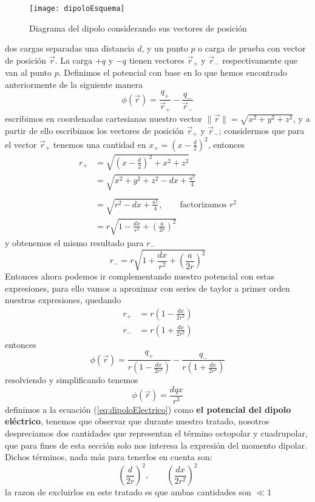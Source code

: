 \documentclass[11pt,a4paper]{article}
\begin{document}
\begin{figure}[h!]
\centering
\texttt{[image: dipoloEsquema]}
\caption{Diagrama del dipolo considerando sus vectores de posición
}
\label{fig:dipoloEsquema}
\end{figure}
dos cargas separadas una distancia $d$, y un punto $p$ o carga de prueba con vector de posición $\vec{r}$. La carga $+q$ y $-q$ tienen vectores $\vec{r}_+$ y $\vec{r}_-$ respectivamente que van al punto $p$. Definimos el potencial con base en lo que hemos encontrado anteriormente de la siguiente manera
$$\phi(\vec{r})=\frac{q_+}{\vec{r}_+}-\frac{q_-}{\vec{r}_-}$$
escribimos en coordenadas cartesianas nuestro vector $\|\vec{r}\|=\sqrt{x^2+y^2+z^2}$, y a partir de ello escribimos los vectores de posición $\vec{r}_+$ y $\vec{r}_-$; considermos que para el vector $\vec{r}_+$ tenemos una cantidad en $x_+=\left(x-\frac{d}{2}\right)^2$, entonces
\begin{align*}
r_+&=\sqrt{\left(x-\frac{d}{2}\right)^2+x^2+z^2} \\
&=\sqrt{x^2+y^2+z^2-dx+\frac{a^2}{4}}\\\\
&=\sqrt{r^2-dx+\frac{a^2}{4}},\qquad\text{factorizamos }r^2\\
&=r\sqrt{1-\frac{dx}{r^2}+\left(\frac{a}{2r}\right)^2}
\end{align*}
y obtenemos el mismo resultado para $r_-$
$$r_-=r\sqrt{1+\frac{dx}{r^2}+\left(\frac{a}{2r}\right)^2}$$
Entonces ahora podemos ir complementando nuestro potencial con estas expresiones, para ello vamos a aproximar con series de taylor a primer orden nuestras expresiones, quedando
\begin{align*}
r_+&=r\left(1-\frac{dx}{2r^2}\right)\\
r_-&=r\left (1+\frac{dx}{2r^2}\right)
\end{align*}
entonces
$$\phi(\vec{r})=\frac{q_+}{r\left(1-\frac{dx}{2r^2}\right)}-\frac{q_-}{r\left(1+\frac{dx}{2r^2}\right)}$$
resolviendo y simplificando tenemos
\begin{equation}\label{eq:dipoloElectrico}
\phi(\vec{r})=\frac{dqx}{r^3}
\end{equation}
definimos a la ecuación (\ref{eq:dipoloElectrico}) como \textbf{el potencial del dipolo eléctrico}, tenemos que observar que durante nuestro tratado, nosotros despreciamos dos cantidades que representan el término octopolar y cuadrupolar, que para fines de esta sección solo nos interesa la expresión del momento dipolar. Dichos términos, nada más para tenerlos en cuenta son:
$$\left(\frac{d}{2r}\right)^2,\qquad \left(\frac{dx}{2r^2}\right)^2$$
la razon de excluirlos en este tratado es que ambas cantidades son $\ll1$
\end{document}

